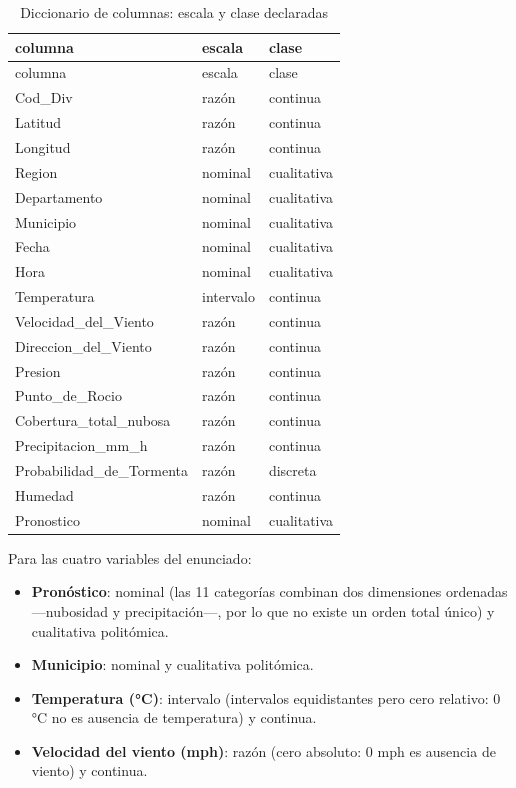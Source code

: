 \documentclass[oneside, openany, fontset=libertinus]{mitthesis}
\providecommand{\tightlist}{\setlength{\itemsep}{0pt}\setlength{\parskip}{0pt}}
\begin{document}
\begin{longtable}[]{@{}lll@{}}
\caption{Diccionario de columnas: escala y clase
declaradas}\tabularnewline
\toprule\noalign{}
columna & escala & clase \\
\midrule\noalign{}
\endfirsthead
\toprule\noalign{}
columna & escala & clase \\
\midrule\noalign{}
\endhead
\bottomrule\noalign{}
\endlastfoot
Cod\_Div & razón & continua \\
Latitud & razón & continua \\
Longitud & razón & continua \\
Region & nominal & cualitativa \\
Departamento & nominal & cualitativa \\
Municipio & nominal & cualitativa \\
Fecha & nominal & cualitativa \\
Hora & nominal & cualitativa \\
Temperatura & intervalo & continua \\
Velocidad\_del\_Viento & razón & continua \\
Direccion\_del\_Viento & razón & continua \\
Presion & razón & continua \\
Punto\_de\_Rocio & razón & continua \\
Cobertura\_total\_nubosa & razón & continua \\
Precipitacion\_mm\_h & razón & continua \\
Probabilidad\_de\_Tormenta & razón & discreta \\
Humedad & razón & continua \\
Pronostico & nominal & cualitativa \\
\end{longtable}

Para las cuatro variables del enunciado:

\begin{itemize}
\tightlist
\item
  \textbf{Pronóstico}: nominal (las 11 categorías combinan dos
  dimensiones ordenadas ---nubosidad y precipitación---, por lo que no
  existe un orden total único) y cualitativa politómica.
\item
  \textbf{Municipio}: nominal y cualitativa politómica.
\item
  \textbf{Temperatura (°C)}: intervalo (intervalos equidistantes pero
  cero relativo: 0 °C no es ausencia de temperatura) y continua.
\item
  \textbf{Velocidad del viento (mph)}: razón (cero absoluto: 0 mph es
  ausencia de viento) y continua.
\end{itemize}
\end{document}
